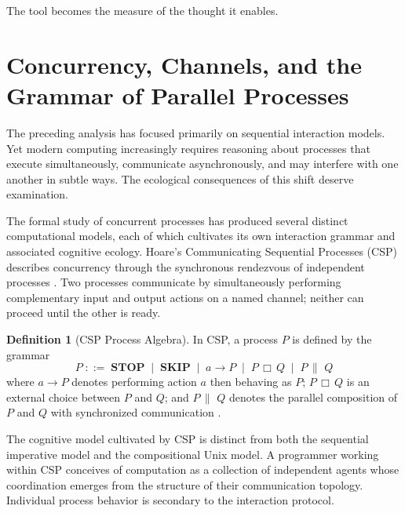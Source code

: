 \documentclass[11pt]{article}
\theoremstyle{definition}
\newtheorem{definition}{Definition}[section]
\begin{document}
The tool becomes the measure of the thought it enables.

\section{Concurrency, Channels, and the Grammar of Parallel Processes}

The preceding analysis has focused primarily on sequential interaction
models. Yet modern computing increasingly requires reasoning about
processes that execute simultaneously, communicate asynchronously, and
may interfere with one another in subtle ways. The ecological
consequences of this shift deserve examination.

The formal study of concurrent processes has produced several distinct
computational models, each of which cultivates its own interaction
grammar and associated cognitive ecology. Hoare's Communicating
Sequential Processes (\textsf{CSP}) describes concurrency through the
synchronous rendezvous of independent processes \cite{hoare1985}. Two
processes communicate by simultaneously performing complementary input
and output actions on a named channel; neither can proceed until the
other is ready.

\begin{definition}[CSP Process Algebra]
In \textsf{CSP}, a process $P$ is defined by the grammar
\[
P \;::=\; \mathbf{STOP} \;\mid\; \mathbf{SKIP} \;\mid\; a \to P
        \;\mid\; P \,\Box\, Q \;\mid\; P \,\|\,\, Q
\]
where $a \to P$ denotes performing action $a$ then behaving as $P$;
$P \,\Box\, Q$ is an external choice between $P$ and $Q$; and
$P \,\|\,\, Q$ denotes the parallel composition of $P$ and $Q$ with
synchronized communication \cite{hoare1985}.
\end{definition}

The cognitive model cultivated by \textsf{CSP} is distinct from both
the sequential imperative model and the compositional Unix model. A
programmer working within \textsf{CSP} conceives of computation as a
collection of independent agents whose coordination emerges from the
structure of their communication topology. Individual process behavior
is secondary to the interaction protocol.
\end{document}
